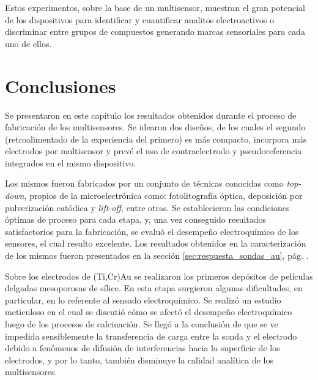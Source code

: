 		 Estos experimentos, sobre la base de un multisensor, muestran el gran potencial de los dispositivos para identificar y cuantificar analitos electroactivos o discriminar entre grupos de compuestos generando marcas sensoriales para cada uno de ellos. 
					     
\section{Conclusiones}

	Se presentaron en este capítulo los resultados obtenidos durante el proceso de fabricación de los multisensores. Se idearon dos diseños, de los cuales el segundo (retroalimentado de la experiencia del primero) es más compacto, incorpora más electrodos por multisensor y prevé el uso de contraelectrodo y pseudoreferencia integrados en el mismo dispositivo.
	
	Los mismos fueron fabricados por un conjunto de técnicas conocidas como \textit{top-down}, propios de la microelectrónica como: fotolitografía óptica, deposición por pulverización catódica y \textit{lift-off}, entre otras. Se establecieron las condiciones óptimas de proceso para cada etapa, y, una vez conseguido resultados satisfactorios para la fabricación, se evaluó el desempeño electroquímico de los sensores, el cual resulto excelente. Los resultados obtenidos en la caracterización de los mismos fueron presentados en la sección \ref{sec:respuesta_sondas_au}, pág. \pageref{sec:respuesta_sondas_au}. 

	Sobre los electrodos de (Ti,Cr)\textbar Au se realizaron los primeros depósitos de películas delgadas mesoporosas de sílice. En esta etapa surgieron algunas dificultades, en particular, en lo referente al sensado electroquímico. Se realizó un estudio meticuloso en el cual se discutió cómo se afectó el desempeño electroquímico luego de los procesos de calcinación. Se llegó a la conclusión de que se ve impedida sensiblemente la transferencia de carga entre la sonda y el electrodo debido a fenómenos de difusión de interferencias hacia la superficie de los electrodos, y por lo tanto, también disminuye la calidad analítica de los multisensores.

